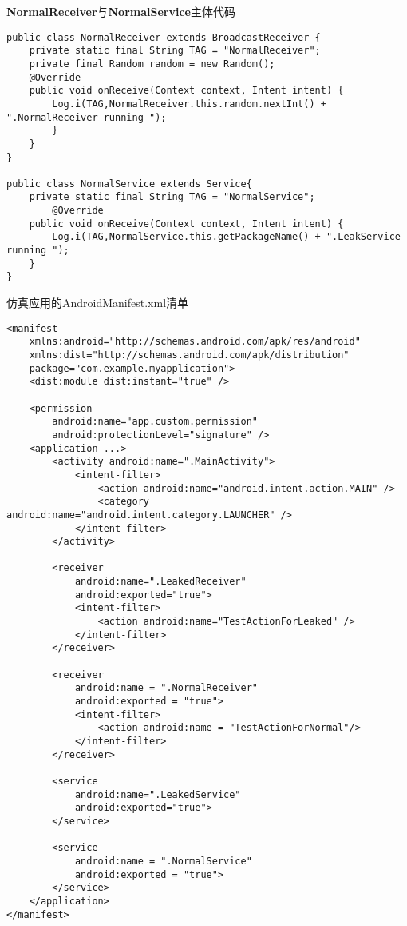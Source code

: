 \begin{listing}[htbp]
	\centering
	\caption{\textbf{NormalReceiver}与\textbf{NormalService}主体代码}
	\begin{verbatim}
public class NormalReceiver extends BroadcastReceiver {
	private static final String TAG = "NormalReceiver";
	private final Random random = new Random();
	@Override
	public void onReceive(Context context, Intent intent) {
		Log.i(TAG,NormalReceiver.this.random.nextInt() + ".NormalReceiver running ");
		}
	}
}

public class NormalService extends Service{
	private static final String TAG = "NormalService";
		@Override
	public void onReceive(Context context, Intent intent) {
		Log.i(TAG,NormalService.this.getPackageName() + ".LeakService running ");
	}
}
	\end{verbatim}
	\label{code:Normal}
\end{listing}

\begin{listing}[htbp]
	\centering
	\caption{仿真应用的AndroidManifest.xml清单}
	\begin{verbatim}
<manifest
	xmlns:android="http://schemas.android.com/apk/res/android"
	xmlns:dist="http://schemas.android.com/apk/distribution"
	package="com.example.myapplication">
	<dist:module dist:instant="true" />

	<permission
		android:name="app.custom.permission"
		android:protectionLevel="signature" />
	<application ...>
		<activity android:name=".MainActivity">
			<intent-filter>
				<action android:name="android.intent.action.MAIN" />
				<category android:name="android.intent.category.LAUNCHER" />
			</intent-filter>
		</activity>
		
		<receiver
			android:name=".LeakedReceiver"
			android:exported="true">
			<intent-filter>
				<action android:name="TestActionForLeaked" />
			</intent-filter>
		</receiver>
		
		<receiver
			android:name = ".NormalReceiver"
			android:exported = "true">
			<intent-filter>
				<action android:name = "TestActionForNormal"/>
			</intent-filter>
		</receiver>
		
		<service
			android:name=".LeakedService"
			android:exported="true">
		</service>
	
		<service
			android:name = ".NormalService"
			android:exported = "true">
		</service>
	</application>
</manifest>
	\end{verbatim}
	\label{code: manifest}
\end{listing}

